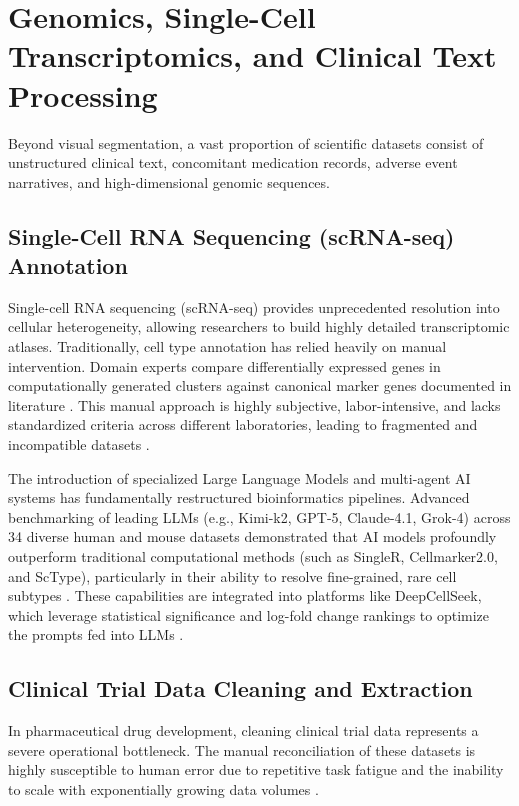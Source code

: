 \documentclass[conference]{IEEEtran}
\begin{document}
\section{Genomics, Single-Cell Transcriptomics, and Clinical Text Processing}
Beyond visual segmentation, a vast proportion of scientific datasets consist of unstructured clinical text, concomitant medication records, adverse event narratives, and high-dimensional genomic sequences.

\subsection{Single-Cell RNA Sequencing (scRNA-seq) Annotation}
Single-cell RNA sequencing (scRNA-seq) provides unprecedented resolution into cellular heterogeneity, allowing researchers to build highly detailed transcriptomic atlases. Traditionally, cell type annotation has relied heavily on manual intervention. Domain experts compare differentially expressed genes in computationally generated clusters against canonical marker genes documented in literature \cite{ref22}. This manual approach is highly subjective, labor-intensive, and lacks standardized criteria across different laboratories, leading to fragmented and incompatible datasets \cite{ref22}.

The introduction of specialized Large Language Models and multi-agent AI systems has fundamentally restructured bioinformatics pipelines. Advanced benchmarking of leading LLMs (e.g., Kimi-k2, GPT-5, Claude-4.1, Grok-4) across 34 diverse human and mouse datasets demonstrated that AI models profoundly outperform traditional computational methods (such as SingleR, Cellmarker2.0, and ScType), particularly in their ability to resolve fine-grained, rare cell subtypes \cite{ref22}. These capabilities are integrated into platforms like DeepCellSeek, which leverage statistical significance and log-fold change rankings to optimize the prompts fed into LLMs \cite{ref22}.

\subsection{Clinical Trial Data Cleaning and Extraction}
In pharmaceutical drug development, cleaning clinical trial data represents a severe operational bottleneck. The manual reconciliation of these datasets is highly susceptible to human error due to repetitive task fatigue and the inability to scale with exponentially growing data volumes \cite{ref32}.
\end{document}
